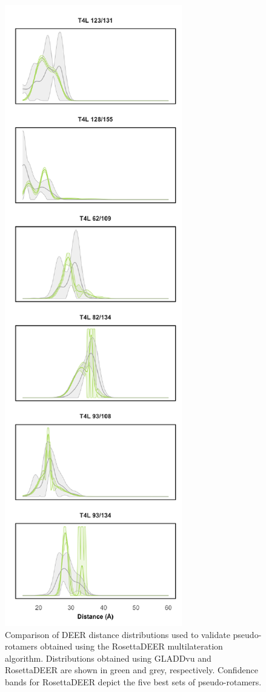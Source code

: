 \begin{figure}[h]
\centering
\includegraphics[width=2.in]{Figures/multilateration_supp_validation.pdf}
\caption[Comparison of DEER distance distributions used to validate pseudo-rotamers obtained using the RosettaDEER multilateration algorithm.]{Comparison of DEER distance distributions used to validate pseudo-rotamers obtained using the RosettaDEER multilateration algorithm. Distributions obtained using GLADDvu and RosettaDEER are shown in green and grey, respectively. Confidence bands for RosettaDEER depict the five best sets of pseudo-rotamers.}
\label{fig:multilateration_supp_validation}
\end{figure}

